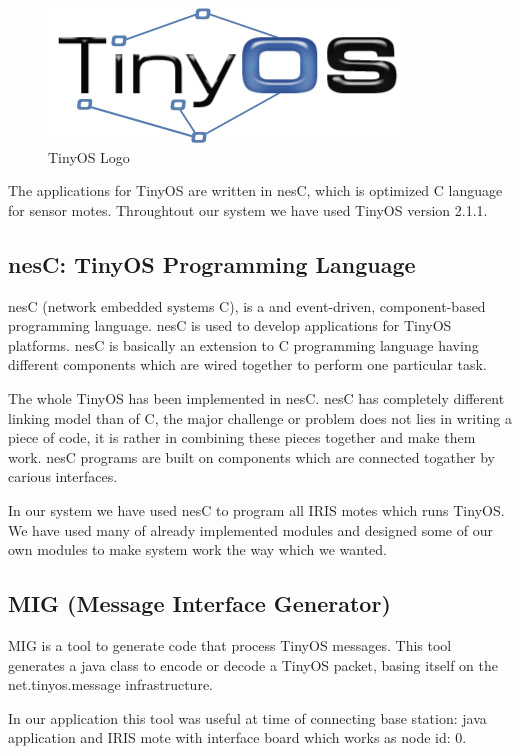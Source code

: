 \documentclass [a4paper,12pt]{book}
\begin{document}
\vspace{0.5cm}
\begin{figure}[!h]
\begin{center}
\includegraphics[scale=0.5]{images/19.jpg}
\caption{TinyOS Logo}
\label{tinyos}
\end{center}
\end{figure}

The applications for TinyOS are written in nesC, which is optimized C language for sensor motes. Throughtout our system we have used TinyOS version 2.1.1.

\subsection{nesC: TinyOS Programming Language}
nesC (network embedded systems C), is a  and event-driven, component-based programming language. nesC is used to develop applications for TinyOS platforms. nesC is basically an extension to C programming language having different components which are wired together to perform one particular task.

The whole TinyOS has been implemented in nesC. nesC has completely different linking model than of C, the major challenge or problem does not lies in writing a piece of code, it is rather in combining these pieces together and make them work. nesC programs are built on components which are connected togather by carious interfaces.

In our system we have used nesC to program all IRIS motes which runs TinyOS. We have used many of already implemented modules and designed some of our own modules to make system work the way which we wanted.

\subsection{MIG (Message Interface Generator)}
MIG is a tool to generate code that process TinyOS messages. This tool generates a java class to encode or decode a TinyOS packet, basing itself on the net.tinyos.message infrastructure.

In our application this tool was useful at time of connecting base station: java application and IRIS mote with interface board which works as node id: 0.
\end{document}
